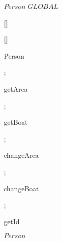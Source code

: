 \kClass $Person$ \kISO $GLOBAL$
\par
\kInstanceVarDef
\parlinebr
\begin{insvar}
[{\Nil }]
\end{insvar}
\begin{insvar}
[{\Nil }]
\end{insvar}
\begin{insvar}
\end{insvar}
\par
\kOperations
{}\begin{op}[e]{Person}%
\signature{Pid \Oto Person}
;
\end{op}
\begin{op}[e]{getArea}%
\signature{() \Oto {}}
\parms{}
;
\end{op}
\begin{op}[e]{getBoat}%
\signature{() \Oto {}}
\parms{}
;
\end{op}
\begin{op}[e]{changeArea}%
\signature{Aid \Oto ()}
;
\end{op}
\begin{op}[e]{changeBoat}%
\signature{Bid \Oto ()}
;
\end{op}
\begin{op}[e]{getId}%
\signature{() \Oto Pid}
\parms{}
\end{op}
\kEnd $Person$

